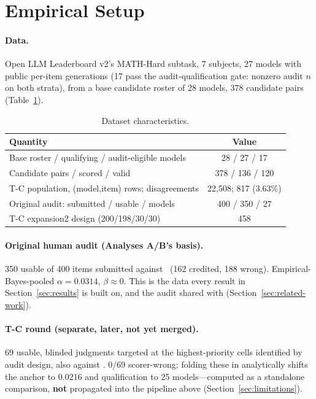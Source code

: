 \section{Empirical Setup}
\label{sec:empirical-setup}

\paragraph{Data.} Open LLM Leaderboard v2's MATH-Hard subtask, 7 subjects,
27 models with public per-item generations (17 pass the audit-qualification
gate: nonzero audit $n$ on both strata), from a base candidate roster of 28
models, 378 candidate pairs (Table~\ref{tab:dataset}).

\begin{table}[t]
  \centering
  \caption{Dataset characteristics.}
  \label{tab:dataset}
  \small
  \begin{tabular}{@{}lc@{}}
    \toprule
    Quantity & Value \\
    \midrule
    Base roster / qualifying / audit-eligible models & 28 / 27 / 17 \\
    Candidate pairs / scored / valid & 378 / 136 / 120 \\
    T-C population, (model,item) rows; disagreements & 22{,}508; 817 (3.63\%) \\
    Original audit: submitted / usable / models & 400 / 350 / 27 \\
    T-C expansion2 design (200/198/30/30) & 458 \\
    \bottomrule
  \end{tabular}
\end{table}

\paragraph{Original human audit (Analyses A/B's basis).} 350 usable of 400
items submitted against \scoreboxed\ (162 credited, 188 wrong).
Empirical-Bayes-pooled $\alpha=0.0314$, $\beta\approx0$. This is the data
every result in Section~\ref{sec:results} is built on, and the audit shared
with \citet{pall2026identified} (Section~\ref{sec:related-work}).

\paragraph{T-C round (separate, later, not yet merged).} 69 usable,
blinded judgments targeted at the highest-priority cells identified by
audit design, also against \scoreboxed. 0/69 scorer-wrong; folding these in
analytically shifts the anchor to 0.0216 and qualification to 25
models---computed as a standalone comparison, \textbf{not} propagated into
the pipeline above (Section~\ref{sec:limitations}).

